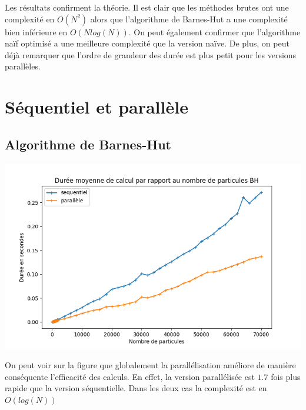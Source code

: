 \par Les résultats confirment la théorie. Il est clair que les méthodes brutes ont une complexité en $O(N^2)$ alors que l'algorithme de Barnes-Hut a une complexité bien inférieure en $O(Nlog(N))$.
On peut également confirmer que l'algorithme naïf optimisé a une meilleure complexité que la version naïve.
De plus, on peut déjà remarquer que l'ordre de grandeur des durée est plus petit pour les versions parallèles.
 
\section{Séquentiel et parallèle}

\subsection{Algorithme de Barnes-Hut}
\begin{center}
\includegraphics[scale=0.6]{./resultats/comparison_BH.png}
\captionsetup{hypcap=false}
\label{fig13}
\end{center}

On peut voir sur la figure que globalement la parallélisation améliore de manière conséquente l'efficacité des calculs. En effet, la version parallélisée est $1.7$ fois plus rapide que la version séquentielle. Dans les deux cas la complexité est en $O(log(N))$


